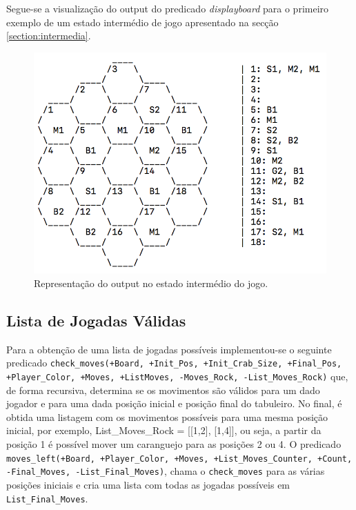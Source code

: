 \documentclass[a4paper]{article}
\begin{document}
Segue-se a visualização do output do predicado \textit{display\textunderscore board} para o primeiro exemplo de um estado intermédio de jogo apresentado na secção \ref{section:intermedia}.

\begin{figure}[!ht]
	\begin{center}
	\includegraphics[scale=0.4]{img/display_board.png}
	\caption{Representação do output no estado intermédio do jogo.}
    \label{Fig:display_board}
	\end{center}
\end{figure}

\newpage

\subsection{Lista de Jogadas Válidas}
Para a obtenção de uma lista de jogadas possíveis implementou-se o seguinte predicado \texttt{check\_moves(+Board, +Init\_Pos, +Init\_Crab\_Size, +Final\_Pos, +Player\_Color, +Moves, +ListMoves, -Moves\_Rock, -List\_Moves\_Rock)} que, de forma recursiva, determina se os movimentos são válidos para um dado jogador e para uma dada posição inicial e posição final do tabuleiro. No final, é obtida uma listagem com os movimentos possíveis para uma mesma posição inicial, por exemplo, List\_Moves\_Rock = [[1,2], [1,4]], ou seja, a partir da posição 1 é possível mover um caranguejo para as posições 2 ou 4. O predicado \texttt{moves\_left(+Board, +Player\_Color, +Moves, +List\_Moves\_Counter, +Count, -Final\_Moves, -List\_Final\_Moves)}, chama o \texttt{check\_moves} para as várias posições iniciais e cria uma lista com todas as jogadas possíveis em \texttt{List\_Final\_Moves}.
\end{document}
